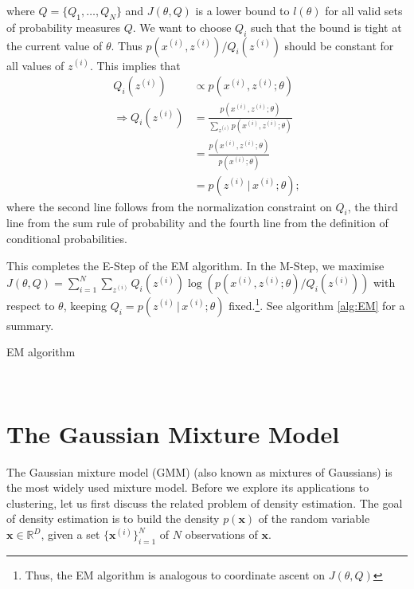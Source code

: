 \documentclass[final,3p,times,twocolumn]{elsarticle}
\DeclareMathOperator*{\argmax}{arg\,max}
\begin{document}
where $Q=\{Q_1,\dots,Q_N\}$ and $J(\theta,Q)$ is a lower bound to $l(\theta)$ for all valid sets of probability measures $Q$.
We want to choose $Q_i$ such that the bound is tight at the current value of $\theta$.
Thus $p(x^{(i)},z^{(i)})/Q_i(z^{(i)})$ should be constant for all values of $z^{(i)}$. This implies that
\begin{equation}
\begin{split}
Q_i(z^{(i)}) &\propto p(x^{(i)},z^{(i)};\theta)\\
\Rightarrow Q_i(z^{(i)}) &= \frac{p(x^{(i)},z^{(i)};\theta)}{\sum_{z^{(i)}}p(x^{(i)},z^{(i)};\theta)}\\
&= \frac{p(x^{(i)},z^{(i)};\theta)}{p(x^{(i)};\theta)}\\
&= p(z^{(i)}\,|\,x^{(i)};\theta);
\end{split}
\end{equation}
where the second line follows from the normalization constraint on $Q_i$, the third line from the sum rule of probability and the fourth line from the definition of conditional probabilities.

This completes the E-Step of the EM algorithm.
In the M-Step, we maximise $J(\theta,Q) = \sum_{i=1}^N \sum_{z^{(i)}} Q_i(z^{(i)}) \log \left(p(x^{(i)},z^{(i)};\theta)/Q_i(z^{(i)})\right)$ with respect to $\theta$, keeping $Q_i = p(z^{(i)}\,|\,x^{(i)};\theta)$ fixed.\footnote{Thus, the EM algorithm is analogous to coordinate ascent on $J(\theta,Q)$}.
See algorithm \ref{alg:EM} for a summary.

\begin{algorithm}
\caption{EM algorithm}
\label{alg:EM}
\begin{algorithmic}[1]
\Repeat
{}
\EndFor
{}
\State{$\theta = \argmax_\theta \sum_{i=1}^N \sum_{z^{(i)}} Q_i(z^{(i)}) \log \frac{p(x^{(i)},z^{(i)};\theta)}{Q_i(z^{(i)})}$}
\EndProcedure \\
\end{algorithmic}
\end{algorithm}




\section{The Gaussian Mixture Model}
\label{sect:gmm}
The Gaussian mixture model (GMM) (also known as mixtures of Gaussians) is the most widely used mixture model.
Before we explore its applications to clustering, let us first discuss the related problem of density estimation.
The goal of density estimation is to build the density $p(\boldsymbol x)$ of the random variable $\boldsymbol x \in \mathbb{R}^D$, given a set $\{\boldsymbol x^{(i)}\}_{i=1}^N$ of $N$ observations of $\boldsymbol x$.
\end{document}
